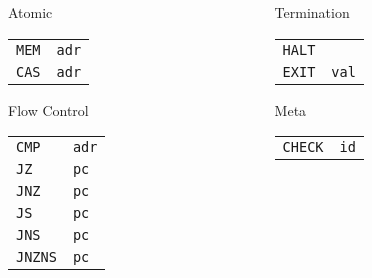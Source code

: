 \documentclass{beamer}
\newcommand{\lstASM}[1]{\lstinline[style=asm]{#1}}
\begin{document}
\begin{frame}[fragile]
\begin{columns}
    \begin{column}{0.2\textwidth}
      \begin{textbox}{Atomic}\color{black}
        \begin{tabular}{ll}
          \lstASM{MEM} & \lstASM{adr} \\
          \lstASM{CAS} & \lstASM{adr} \\
        \end{tabular}
      \end{textbox}
      \vspace{0.1cm}
      \begin{textbox}{Flow Control}\color{black}
        \begin{tabular}{ll}
          \lstASM{CMP} & \lstASM{adr} \\
          \lstASM{JZ} & \lstASM{pc} \\
          \lstASM{JNZ} & \lstASM{pc} \\
          \lstASM{JS} & \lstASM{pc} \\
          \lstASM{JNS} & \lstASM{pc} \\
          \lstASM{JNZNS} & \lstASM{pc} \\
        \end{tabular}
      \end{textbox}
    \end{column}

    \begin{column}{0.2\textwidth}
      \vspace{-2.1cm}
      \begin{textbox}{Termination}\color{black}
        \begin{tabular}{ll}
          \lstASM{HALT} \\
          \lstASM{EXIT} & \lstASM{val} \\
        \end{tabular}
      \end{textbox}
      \vspace{0.1cm}
      \begin{textbox}{Meta}\color{black}
        \begin{tabular}{ll}
          \lstASM{CHECK} & \lstASM{id} \\
        \end{tabular}
      \end{textbox}
    \end{column}
  \end{columns}
  \vfill
\end{frame}
\end{document}
